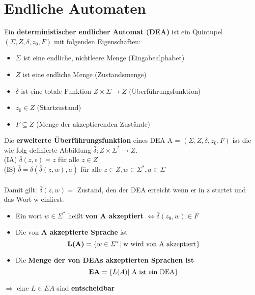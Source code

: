 \documentclass[14pt]{article}
\begin{document}
\section{Endliche Automaten}
\begin{definition}
    Ein \textbf{deterministischer endlicher Automat (DEA)} ist ein
    Quintupel $(\varSigma, Z, \delta, z_0, F)$ mit folgenden Eigenschaften:
    \begin{itemize}
        \item $\varSigma$ ist eine endliche, nichtleere Menge (Eingabealphabet)
        \item $Z$ ist eine endliche Menge (Zustandsmenge)
        \item $\delta$ ist eine totale Funktion $Z \times \varSigma \rightarrow Z$
              (Überführungsfunktion)
        \item $z_0 \in Z$ (Startzustand)
        \item $F \subseteq Z$ (Menge der akzeptierenden Zustände)
    \end{itemize}
\end{definition}
\begin{definition}
    Die \textbf{erweiterte Überführungsfunktion} eines DEA A = $(\varSigma, Z, \delta,
        z_0, F)$ ist die wie folg definierte Abbildung $\bar{\delta} : Z \times
        \varSigma^* \rightarrow Z$. \\
    (IA) $\bar{\delta}(z, \epsilon) = z$ für alle $z \in Z$ \\
    (IS) $\bar{\delta} = \delta(\bar{\delta}(z, w), a)$ für alle $z \in Z, w \in
        \varSigma^*, a \in \varSigma$ \\
    \\
    Damit gilt: $\bar{\delta}(z, w) = $ Zustand, den der DEA erreicht wenn er in
    z startet und das Wort w einliest.
\end{definition}
\begin{definition}
    \begin{itemize}
        \item Ein wort $w \in \varSigma^*$ heißt \textbf{von A akzeptiert} $\Leftrightarrow
                  \bar{\delta}(z_0, w) \in F$
        \item Die von \textbf{A akzeptierte Sprache} ist
              \[
                  \text{\textbf{L(A)}} = \{ w \in \varSigma^* | \text{ w wird von
                      A akzeptiert}\}
              \]
        \item Die \textbf{Menge der von DEAs akzeptierten Sprachen ist}
              \[
                  \text{\textbf{EA}} = \{ L(A) | \text{ A ist ein DEA}\}
              \]
    \end{itemize}
\end{definition}
$\Rightarrow$ eine $L \in EA$ sind \textbf{entscheidbar}
\end{document}
